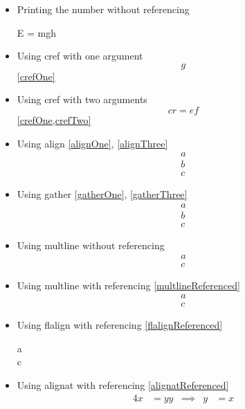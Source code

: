 \documentclass{article}
\begin{document}
\begin{itemize}
\begin{equation}
			\end{equation}
		\item Printing the number without referencing
			\begin{equation+}
				E = mgh
			\end{equation+}
		\item Using cref with one argument
			\begin{equation}\label{crefOne}
				g
			\end{equation}
			\cref{crefOne}
		\item Using cref with two arguments
			\begin{equation}\label{crefTwo}
				cr = ef
			\end{equation}
			\cref{crefOne,crefTwo}
		\item Using align \ref{alignOne}, \ref{alignThree}
			\begin{align}
				a\label{alignOne}\\
				b\label{alignTwo}\\
				c\label{alignThree}
			\end{align}
		\item Using gather \ref{gatherOne}, \ref{gatherThree}
			\begin{gather}
				a\label{gatherOne}\\
				b\label{gatherTwo}\\
				c\label{gatherThree}
			\end{gather}
		\item Using multline without referencing
			\begin{multline}
				a\\
				c\label{multlineUnreferenced}
			\end{multline}
		\item Using multline with referencing \ref{multlineReferenced}
			\begin{multline}
				a\\
				c\label{multlineReferenced}
			\end{multline}
		\item Using flalign with referencing \ref{flalignReferenced}
			\begin{flalign}
				a\\
				c\label{flalignReferenced}
			\end{flalign}
		\item Using alignat with referencing \ref{alignatReferenced}
			\begin{alignat}{4}
				x &= yy & \implies & y &= x \label{alignatUnreferenced}\\

\end{alignat}
\end{itemize}
\end{document}
